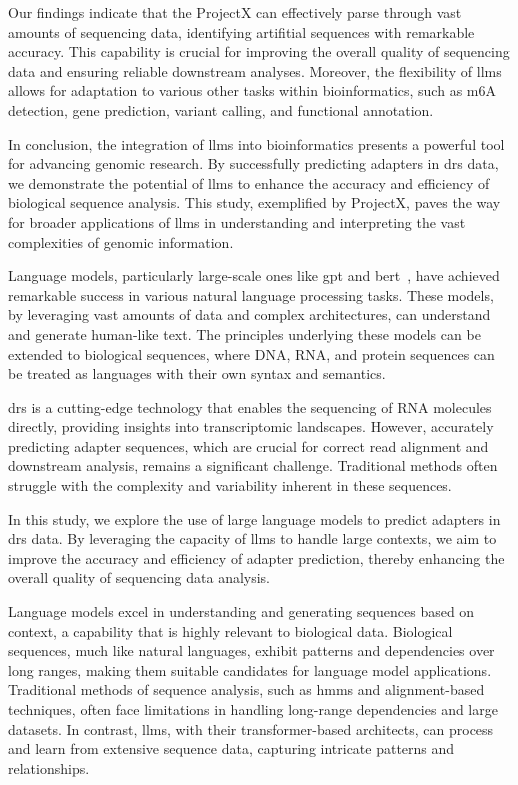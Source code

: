 \documentclass[pdflatex, sn-mathphys-num, lineno]{sn-jnl}%
\newcommand{\chopper}{ProjectX\xspace}
\theoremstyle{thmstyleone}%
\theoremstyle{thmstyletwo}%
\theoremstyle{thmstylethree}%
\begin{document}
Our findings indicate that the \chopper can effectively parse through vast amounts of sequencing data, identifying  artifitial sequences with remarkable accuracy.
This capability is crucial for improving the overall quality of sequencing data and ensuring reliable downstream analyses.
Moreover, the flexibility of \glspl{llm} allows for adaptation to various other tasks within bioinformatics, such as m6A detection, gene prediction, variant calling, and functional annotation.

In conclusion, the integration of \glspl{llm} into bioinformatics presents a powerful tool for advancing genomic research.
By successfully predicting adapters in \gls{drs} data, we demonstrate the potential of \glspl{llm} to enhance the accuracy and efficiency of biological sequence analysis.
This study, exemplified by \chopper, paves the way for broader applications of \glspl{llm} in understanding and interpreting the vast complexities of genomic information.

Language models, particularly large-scale ones like \gls{gpt} and \gls{bert}~\cite{devlin2018bert}, have achieved remarkable success in various natural language processing tasks.
These models, by leveraging vast amounts of data and complex architectures, can understand and generate human-like text.
The principles underlying these models can be extended to biological sequences, where DNA, RNA, and protein sequences can be treated as languages with their own syntax and semantics.

\gls{drs} is a cutting-edge technology that enables the sequencing of RNA molecules directly, providing insights into transcriptomic landscapes.
However, accurately predicting adapter sequences, which are crucial for correct read alignment and downstream analysis, remains a significant challenge.
Traditional methods often struggle with the complexity and variability inherent in these sequences.

In this study, we explore the use of large language models to predict adapters in \gls{drs} data.
By leveraging the capacity of \glspl{llm} to handle large contexts, we aim to improve the accuracy and efficiency of adapter prediction, thereby enhancing the overall quality of sequencing data analysis.


Language models excel in understanding and generating sequences based on context, a capability that is highly relevant to biological data.
Biological sequences, much like natural languages, exhibit patterns and dependencies over long ranges, making them suitable candidates for language model applications.
Traditional methods of sequence analysis, such as \glspl{hmm} and alignment-based techniques, often face limitations in handling long-range dependencies and large datasets.
In contrast, \glspl{llm}, with their transformer-based architects, can process and learn from extensive sequence data, capturing intricate patterns and relationships.
\end{document}
